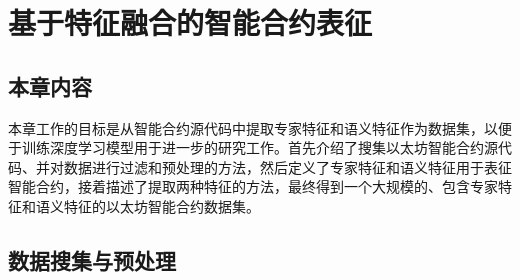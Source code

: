 \chapter{基于特征融合的智能合约表征}
\section{本章内容}
本章工作的目标是从智能合约源代码中提取专家特征和语义特征作为数据集，以便于训练深度学习模型用于进一步的研究工作。首先介绍了搜集以太坊智能合约源代码、并对数据进行过滤和预处理的方法，然后定义了专家特征和语义特征用于表征智能合约，接着描述了提取两种特征的方法，最终得到一个大规模的、包含专家特征和语义特征的以太坊智能合约数据集。
\section{数据搜集与预处理}

